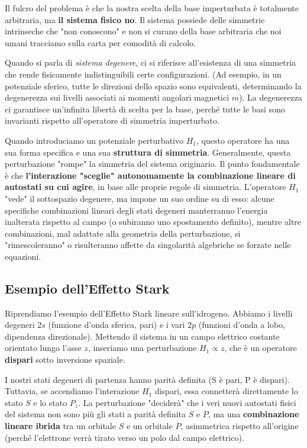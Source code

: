 Il fulcro del problema è che la nostra scelta della base imperturbata è totalmente arbitraria, ma \textbf{il sistema fisico no}. Il sistema possiede delle simmetrie intrinseche che "non conoscono" e non si curano della base arbitraria che noi umani tracciamo sulla carta per comodità di calcolo.

Quando si parla di \textit{sistema degenere}, ci si riferisce all'esistenza di una simmetria che rende fisicamente indistinguibili certe configurazioni. (Ad esempio, in un potenziale sferico, tutte le direzioni dello spazio sono equivalenti, determinando la degenerezza sui livelli associati ai momenti angolari magnetici $m$). La degenerezza ci garantisce un'infinita libertà di scelta per la base, perché tutte le basi sono invarianti rispetto all'operatore di simmetria imperturbato.

Quando introduciamo un potenziale perturbativo $H_1$, questo operatore ha una sua forma specifica e una sua \textbf{struttura di simmetria}. Generalmente, questa perturbazione "rompe" la simmetria del sistema originario.
Il punto fondamentale è che \textbf{l'interazione "sceglie" autonomamente la combinazione lineare di autostati su cui agire}, in base alle proprie regole di simmetria. L'operatore $H_1$ "vede" il sottospazio degenere, ma impone un suo ordine su di esso: alcune specifiche combinazioni lineari degli stati degeneri manterranno l'energia inalterata rispetto al campo (o subiranno uno spostamento definito), mentre altre combinazioni, mal adattate alla geometria della perturbazione, si "rimescoleranno" o risulteranno affette da singolarità algebriche se forzate nelle equazioni.

\subsection{Esempio dell'Effetto Stark}
Riprendiamo l'esempio dell'Effetto Stark lineare sull'idrogeno.
Abbiamo i livelli degeneri $2s$ (funzione d'onda sferica, pari) e i vari $2p$ (funzioni d'onda a lobo, dipendenza direzionale). Mettendo il sistema in un campo elettrico costante orientato lungo l'asse $z$, inseriamo una perturbazione $H_1 \propto z$, che è un operatore \textbf{dispari} sotto inversione spaziale.

I nostri stati degeneri di partenza hanno parità definita (S è pari, P è dispari). Tuttavia, se accendiamo l'interazione $H_1$ dispari, essa connetterà direttamente lo stato $S$ e lo stato $P_z$. La perturbazione "deciderà" che i veri nuovi autostati fisici del sistema non sono più gli stati a parità definita $S$ e $P$, ma una \textbf{combinazione lineare ibrida} tra un orbitale $S$ e un orbitale $P$, asimmetrica rispetto all'origine (perché l'elettrone verrà tirato verso un polo dal campo elettrico).

